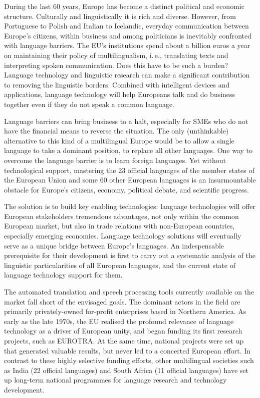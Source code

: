 \begin{multicols}{2}
During the last 60 years, Europe has become a distinct political and economic structure. Culturally and linguistically it is rich and diverse. However, from Portuguese to Polish and Italian to Icelandic, everyday communication between Europe’s citizens, within business and among politicians is inevitably confronted with language barriers. The EU's institutions spend about a billion euros a year on maintaining their policy of multilingualism, i.\,e., translating texts and interpreting spoken communication. Does this have to be such a burden? Language technology and linguistic research can make a significant contribution to removing the linguistic borders. Combined with intelligent devices and applications, language technology will help Europeans talk and do business together even if they do not speak a common language. 


Language barriers can bring business to a halt, especially for SMEs who do not have the financial means to reverse the situation. The only (unthinkable) alternative to this kind of a multilingual Europe would be to allow a single language to take a dominant position, to replace all other languages.  One way to overcome the language barrier is to learn foreign languages. Yet without technological support, mastering the 23 official languages of the member states of the European Union and some 60 other European languages is an insurmountable obstacle for Europe’s citizens, economy, political debate, and scientific progress.

The solution is to build key enabling technologies: language technologies will offer European stakeholders tremendous advantages, not only within the common European market, but also in trade relations with non-European countries, especially emerging economies. Language technology solutions will eventually serve as a unique bridge between Europe's languages. An indespensable prerequisite for their development is first to carry out a systematic analysis of the linguistic particularities of all European languages, and the current state of language technology support for them.  
    
The automated translation and speech processing tools currently available on the market fall short of the envisaged goals. The dominant actors in the field are primarily privately-owned for-profit enterprises based in Northern America. As early as the late 1970s, the EU realised the profound relevance of language technology as a driver of European unity, and began funding its first research projects, such as EUROTRA. At the same time, national projects were set up that generated valuable results, but never led to a concerted European effort. In contrast to these highly selective funding efforts, other multilingual societies such as India (22 official languages) and South Africa (11 official languages) have set up long-term national programmes for language research and technology development. 


\end{multicols}
